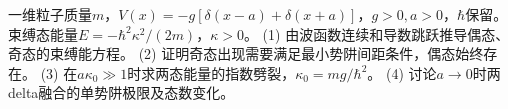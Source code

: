 一维粒子质量\(m\)，\(V(x)=-g[\delta(x-a)+\delta(x+a)]\)，\(g>0,a>0\)，\(\hbar\)保留。束缚态能量\(E=-\hbar^2\kappa^2/(2m)\)，\(\kappa>0\)。
(1) 由波函数连续和导数跳跃推导偶态、奇态的束缚能方程。
(2) 证明奇态出现需要满足最小势阱间距条件，偶态始终存在。
(3) 在\(a\kappa_0\gg1\)时求两态能量的指数劈裂，\(\kappa_0=mg/\hbar^2\)。
(4) 讨论\(a\to0\)时两delta融合的单势阱极限及态数变化。
